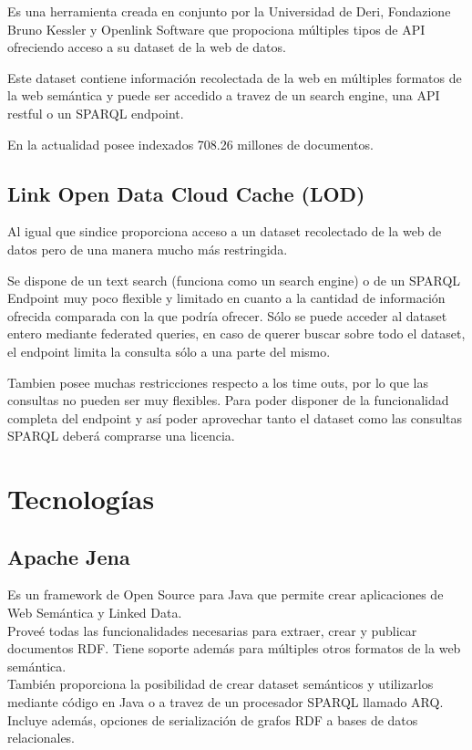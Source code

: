 \cite{Oren2008} Es una herramienta creada en conjunto por la Universidad de Deri,  Fondazione Bruno Kessler y Openlink Software que propociona 
múltiples tipos de API ofreciendo acceso a su dataset de la web de datos. 

Este dataset contiene información recolectada de la web en múltiples formatos de la web semántica y puede ser accedido a travez 
de un search engine, una API restful o un SPARQL endpoint. 

En la actualidad posee indexados 708.26 millones de documentos.

\subsection{Link Open Data Cloud Cache (LOD)} 

Al igual que sindice proporciona acceso a un dataset recolectado de la web de datos pero de una manera mucho más restringida. 

Se dispone de un text search (funciona como un search engine) o de un SPARQL Endpoint muy poco flexible y limitado en cuanto a 
la cantidad de información ofrecida comparada con la que podría ofrecer. Sólo se puede acceder al dataset entero mediante federated
queries, en caso de querer buscar sobre todo el dataset, el endpoint limita la consulta sólo a una parte del mismo. 

Tambien posee muchas restricciones respecto a los time outs, por lo que las consultas no pueden ser muy flexibles.
Para poder disponer de la funcionalidad completa del endpoint y así poder aprovechar tanto el dataset como las consultas SPARQL 
deberá comprarse una licencia.


\section{Tecnologías}

\subsection{Apache Jena}

Es un framework de Open Source para Java que permite crear aplicaciones de Web Semántica y Linked Data. \\
Proveé todas las funcionalidades necesarias para extraer, crear y publicar documentos RDF. Tiene soporte además para múltiples otros 
formatos de la web semántica. \\
También proporciona la posibilidad de crear dataset semánticos y utilizarlos mediante código en Java o a travez de un procesador SPARQL 
llamado ARQ.\\
Incluye además, opciones de serialización de grafos RDF a bases de datos relacionales.


